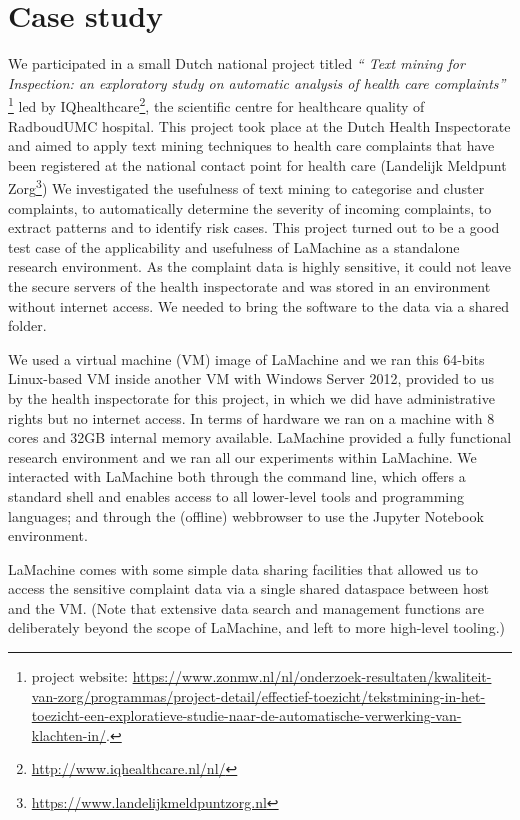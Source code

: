 \documentclass[a4paper,11pt]{article}
\begin{document}
\section{Case study}\label{sec-case}

We participated in a small Dutch national project titled \emph{`` Text mining for Inspection: an exploratory study on automatic analysis of health care complaints''} \footnote{project website:
\url{https://www.zonmw.nl/nl/onderzoek-resultaten/kwaliteit-van-zorg/programmas/project-detail/effectief-toezicht/tekstmining-in-het-toezicht-een-exploratieve-studie-naar-de-automatische-verwerking-van-klachten-in/}.
} led by IQhealthcare\footnote{\url{http://www.iqhealthcare.nl/nl/}}, the scientific centre for healthcare quality of RadboudUMC hospital.
This project took place at the Dutch Health Inspectorate and aimed to apply text mining techniques to health care
complaints that have been registered at the national contact point for health care (Landelijk Meldpunt
Zorg\footnote{\url{https://www.landelijkmeldpuntzorg.nl}})
We investigated the usefulness of text mining to categorise and cluster complaints, to automatically determine the
severity of incoming complaints, to extract patterns  and to identify risk cases. This project turned out to be a good
test case of the applicability and usefulness of LaMachine as a standalone research environment.
As the complaint data is highly sensitive, it could not leave the secure servers of the health inspectorate and was
stored in an environment without internet access. We needed to bring the software to the data via a shared folder.

We used a virtual machine (VM) image of LaMachine and we ran this 64-bits Linux-based VM inside another
VM with Windows Server 2012, provided to us by the health inspectorate for this project, in which we did have administrative
rights but no internet access. In terms of hardware we ran on a machine with 8 cores and  32GB internal memory available.
LaMachine provided a fully functional research environment and we ran all our experiments within LaMachine. We interacted with LaMachine both through the command line, which offers a standard
shell and enables access to all lower-level tools and programming languages; and through the (offline) webbrowser to use
the Jupyter Notebook environment.

LaMachine comes with some simple data sharing facilities that allowed us to access the sensitive complaint data via a single shared dataspace between host and the VM. (Note that extensive data search and management functions are deliberately beyond the scope of LaMachine, and left to more high-level tooling.)
\end{document}
